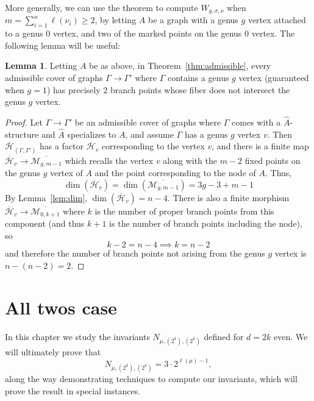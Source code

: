 \documentclass[thesis]{thesis-umich}           %
\newcommand{\Hb}{\overline{\mathcal H}}
\theoremstyle{definition}
\newtheorem{lem}[thm]{Lemma}
\begin{document}
                More generally, we can use the theorem to compute $W_{g,\sigma,\nu}$ when $m=\sum\limits_{i=1}^n\ell(\nu_i)\geq 2$, by letting $A$ be a graph with a genus $g$ vertex attached to a genus $0$ vertex, and two of the
                marked points on the genus $0$ vertex. The following lemma will be useful:

                \begin{lem}
                  \label{lem:branchpoints}
                  Letting $A$ be as above, in Theorem~\ref{thm:admissible}, every admissible cover of graphs $\Gamma\to\Gamma'$ where $\Gamma$ contains a genus $g$ vertex (guaranteed when $g=1$) has precisely $2$ branch points
                  whose fiber does not intersect the genus $g$ vertex.
                \end{lem}

                \begin{proof}
                  Let $\Gamma\to\Gamma'$ be an admissible cover of graphs where $\Gamma$ comes with a $\hat A$-structure and $\hat A$ specializes to $A$, and assume $\Gamma$ has a genus $g$ vertex $v$.
                  Then $\Hb_{(\Gamma,\Gamma')}$ has a factor $\Hb_{v}$ corresponding to the vertex $v$,
                  and there is a finite map $\Hb_{v}\to\overline{\mathcal M_{g,m-1}}$ which recalls
                  the vertex $v$ along with the $m-2$ fixed points on the genus $g$ vertex of $A$ and
                  the point corresponding to the node of $A$. Thus,
                  \[
                  \dim(\Hb_v)=\dim(\overline{\mathcal M_{g,m-1}})=3g-3+m-1
                  \]
                  By Lemma~\ref{lem:dim}, $\dim(\Hb_v)=n-4$. There is also a finite morphism
                  $\Hb_v\to\overline{\mathcal M_{0,k+1}}$ where $k$ is the number of proper branch points from this
                  component (and thus $k+1$ is the number of branch points including the node), so
                  \[
                  k-2=n-4\implies k=n-2
                  \]
                  and therefore the number of branch points not arising from the genus $g$ vertex is $n-(n-2)=2$.
                  \end{proof}


\chapter{All twos case}

In this chapter we study the invariants $N_{\mu,(2^k),(2^k)}$ defined for $d=2k$ even.
We will ultimately prove that
\[
N_{\mu,(2^k),(2^k)}=3\cdot 2^{\ell(\mu)-1},
\]
along the way demonstrating techniques to compute our invariants, which will prove the result in special instances.
\end{document}
